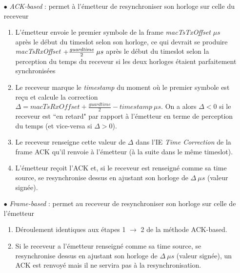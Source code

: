 \documentclass[]{report}
\begin{document}
\begin{itemize}
\item[$\bullet$] \textit{ACK-based} : permet à l'émetteur de resynchroniser son horloge sur celle du receveur
\begin{enumerate}
\item L'émetteur envoie le premier symbole de la frame \textit{macTsTxOffset} $\mu s$ après le début du timeslot selon son horloge, ce qui devrait se produire \textit{macTsRxOffset} $+ \frac{\text{\textit{guardtime}}}{2} \: \mu s $ après le début du timeslot selon la perception du temps du receveur si les deux horloges étaient parfaitement synchronisées 

\item Le receveur marque le \textit{timestamp} du moment où le premier symbole est reçu et calcule la correction $\Delta = \textit{macTsRxOffset} + \frac{\textit{guardtime}}{2} - \textit{timestamp} \: \mu s$. On a alors $\Delta < 0$ si le receveur est ``en retard" par rapport à l'émetteur en terme de perception du temps (et vice-versa si $\Delta > 0$).

\item Le receveur renseigne cette valeur de $\Delta$ dans l'IE \textit{Time Correction} de la frame ACK qu'il renvoie à l'émetteur (à la suite dans le même timeslot).

\item L'émetteur reçoit l'ACK et, si le receveur est renseigné comme sa time source, se resynchronise dessus en ajustant son horloge de $\Delta \: \mu s$ (valeur signée).
\end{enumerate}

\vspace{0.2cm}

\item[$\bullet$] \textit{Frame-based} : permet au receveur de resynchroniser son horloge sur celle de l'émetteur
\begin{enumerate}
\item Déroulement identiques aux étapes 1 $\rightarrow$ 2 de la méthode ACK-based.
\item Si le receveur a l'émetteur renseigné comme sa time source, se resynchronise dessus en ajustant son horloge de $\Delta \: \mu s$ (valeur signée), un ACK est renvoyé mais il ne servira pas à la resynchronisation.
\end{enumerate}

\end{itemize}

\newpage
\end{document}
